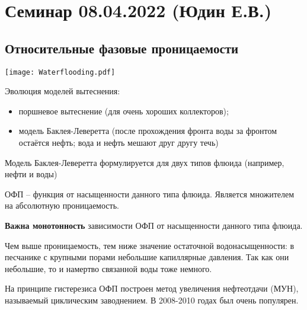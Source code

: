 \documentclass[main.tex]{subfiles}
\begin{document}
\section{Семинар 08.04.2022 (Юдин Е.В.)}

\subsection{Относительные фазовые проницаемости}

\texttt{[image: Waterflooding.pdf]}

Эволюция моделей вытеснения:
\begin{itemize}
	\item поршневое вытеснение (для очень хороших коллекторов);
	\item модель Баклея-Леверетта (после прохождения фронта воды за фронтом остаётся нефть; вода и нефть мешают друг другу течь)
\end{itemize}

Модель Баклея-Леверетта формулируется для двух типов флюида (например, нефти и воды)

ОФП -- функция от насыщенности данного типа флюида. Является множителем на абсолютную проницаемость.

\textbf{Важна монотонность} зависимости ОФП от насыщенности данного типа флюида.


Чем выше проницаемость, тем ниже значение остаточной водонасыщенности: в песчанике с крупными порами небольшие капиллярные давления. Так как они небольшие, то и намертво связанной воды тоже немного.






На принципе гистерезиса ОФП построен метод увеличения нефтеотдачи (МУН), называемый циклическим заводнением. В 2008-2010 годах был очень популярен.

\end{document}
